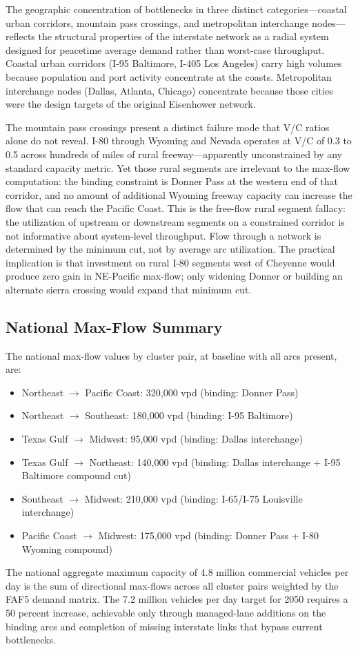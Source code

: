 The geographic concentration of bottlenecks in three distinct categories---coastal urban corridors, mountain pass crossings, and metropolitan interchange nodes---reflects the structural properties of the interstate network as a radial system designed for peacetime average demand rather than worst-case throughput. Coastal urban corridors (I-95 Baltimore, I-405 Los Angeles) carry high volumes because population and port activity concentrate at the coasts. Metropolitan interchange nodes (Dallas, Atlanta, Chicago) concentrate because those cities were the design targets of the original Eisenhower network.

The mountain pass crossings present a distinct failure mode that V/C ratios alone do not reveal. I-80 through Wyoming and Nevada operates at V/C of 0.3 to 0.5 across hundreds of miles of rural freeway---apparently unconstrained by any standard capacity metric. Yet those rural segments are irrelevant to the max-flow computation: the binding constraint is Donner Pass at the western end of that corridor, and no amount of additional Wyoming freeway capacity can increase the flow that can reach the Pacific Coast. This is the free-flow rural segment fallacy: the utilization of upstream or downstream segments on a constrained corridor is not informative about system-level throughput. Flow through a network is determined by the minimum cut, not by average arc utilization. The practical implication is that investment on rural I-80 segments west of Cheyenne would produce zero gain in NE-Pacific max-flow; only widening Donner or building an alternate sierra crossing would expand that minimum cut.

\subsection{National Max-Flow Summary}

The national max-flow values by cluster pair, at baseline with all arcs present, are:
\begin{itemize}
  \item Northeast $\to$ Pacific Coast: 320,000 vpd (binding: Donner Pass)
  \item Northeast $\to$ Southeast: 180,000 vpd (binding: I-95 Baltimore)
  \item Texas Gulf $\to$ Midwest: 95,000 vpd (binding: Dallas interchange)
  \item Texas Gulf $\to$ Northeast: 140,000 vpd (binding: Dallas interchange + I-95 Baltimore compound cut)
  \item Southeast $\to$ Midwest: 210,000 vpd (binding: I-65/I-75 Louisville interchange)
  \item Pacific Coast $\to$ Midwest: 175,000 vpd (binding: Donner Pass + I-80 Wyoming compound)
\end{itemize}

The national aggregate maximum capacity of 4.8 million commercial vehicles per day \citep{FHWA_freight2023} is the sum of directional max-flows across all cluster pairs weighted by the FAF5 demand matrix. The 7.2 million vehicles per day target for 2050 requires a 50 percent increase, achievable only through managed-lane additions on the binding arcs and completion of missing interstate links that bypass current bottlenecks.
